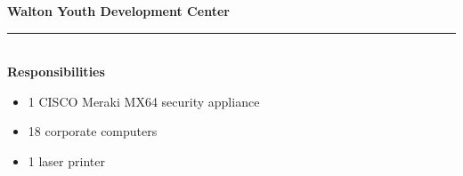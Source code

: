 \textbf{Walton Youth Development Center}
\vspace{2pt}\hrule\hfill\\
\textbf{Responsibilities}
\begin{itemize}[leftmargin=*]
    \item 1 CISCO Meraki MX64 security appliance
    \item 18 corporate computers 
    \item 1 laser printer
\end{itemize}